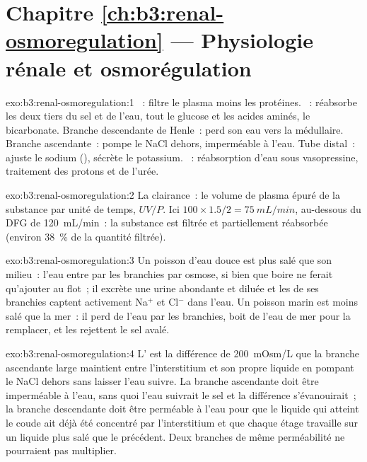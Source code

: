 \section*{Chapitre \ref{ch:b3:renal-osmoregulation} --- Physiologie rénale et osmorégulation}

\begin{solution}{exo:b3:renal-osmoregulation:1}
~: filtre le plasma moins les protéines. ~:
réabsorbe les deux tiers du sel et de l'eau, tout le glucose et les
acides aminés, le bicarbonate. Branche descendante de Henle~: perd son
eau vers la médullaire. Branche ascendante~: pompe le NaCl dehors,
imperméable à l'eau. Tube distal~: ajuste le sodium (),
sécrète le potassium. ~: réabsorption d'eau sous
vasopressine, traitement des protons et de l'urée.
\end{solution}

\begin{solution}{exo:b3:renal-osmoregulation:2}
La clairance~: le volume de plasma épuré de la substance par unité de
temps, $UV/P$. Ici $100\times 1.5/2 = \qty{75}{mL/min}$, au-dessous du
DFG de \qty{120}{mL/min}~: la substance est filtrée et partiellement
réabsorbée (environ \qty{38}{\%} de la quantité filtrée).
\end{solution}

\begin{solution}{exo:b3:renal-osmoregulation:3}
Un poisson d'eau douce est plus salé que son milieu~: l'eau entre par
les branchies par osmose, si bien que boire ne ferait qu'ajouter au
flot~; il excrète une urine abondante et diluée et les  de ses branchies captent activement Na$^{+}$ et Cl$^{-}$ dans
l'eau. Un poisson marin est moins salé que la mer~: il perd de l'eau par
les branchies, boit de l'eau de mer pour la remplacer, et les  rejettent le sel avalé.
\end{solution}

\begin{solution}{exo:b3:renal-osmoregulation:4}
L' est la différence de \qty{200}{mOsm/L} que la branche
ascendante large maintient entre l'interstitium et son propre liquide en
pompant le NaCl dehors sans laisser l'eau suivre. La branche ascendante
doit être imperméable à l'eau, sans quoi l'eau suivrait le sel et la
différence s'évanouirait~; la branche descendante doit être perméable à
l'eau pour que le liquide qui atteint le coude ait déjà été concentré
par l'interstitium et que chaque étage travaille sur un liquide plus
salé que le précédent. Deux branches de même perméabilité ne pourraient
pas multiplier.
\end{solution}

